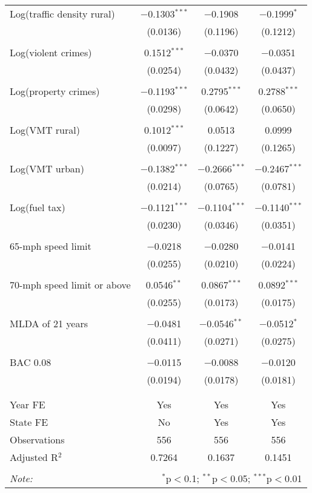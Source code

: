 \begin{table}[!htbp]
\begin{tabular}{@{\extracolsep{5pt}}lccc}
 Log(traffic density rural) & $-$0.1303$^{***}$ & $-$0.1908 & $-$0.1999$^{*}$ \\ 
  & (0.0136) & (0.1196) & (0.1212) \\ 
  & & & \\ 
 Log(violent crimes) & 0.1512$^{***}$ & $-$0.0370 & $-$0.0351 \\ 
  & (0.0254) & (0.0432) & (0.0437) \\ 
  & & & \\ 
 Log(property crimes) & $-$0.1193$^{***}$ & 0.2795$^{***}$ & 0.2788$^{***}$ \\ 
  & (0.0298) & (0.0642) & (0.0650) \\ 
  & & & \\ 
 Log(VMT rural) & 0.1012$^{***}$ & 0.0513 & 0.0999 \\ 
  & (0.0097) & (0.1227) & (0.1265) \\ 
  & & & \\ 
 Log(VMT urban) & $-$0.1382$^{***}$ & $-$0.2666$^{***}$ & $-$0.2467$^{***}$ \\ 
  & (0.0214) & (0.0765) & (0.0781) \\ 
  & & & \\ 
 Log(fuel tax) & $-$0.1121$^{***}$ & $-$0.1104$^{***}$ & $-$0.1140$^{***}$ \\ 
  & (0.0230) & (0.0346) & (0.0351) \\ 
  & & & \\ 
 65-mph speed limit & $-$0.0218 & $-$0.0280 & $-$0.0141 \\ 
  & (0.0255) & (0.0210) & (0.0224) \\ 
  & & & \\ 
 70-mph speed limit or above & 0.0546$^{**}$ & 0.0867$^{***}$ & 0.0892$^{***}$ \\ 
  & (0.0255) & (0.0173) & (0.0175) \\ 
  & & & \\ 
 MLDA of 21 years & $-$0.0481 & $-$0.0546$^{**}$ & $-$0.0512$^{*}$ \\ 
  & (0.0411) & (0.0271) & (0.0275) \\ 
  & & & \\ 
 BAC 0.08 & $-$0.0115 & $-$0.0088 & $-$0.0120 \\ 
  & (0.0194) & (0.0178) & (0.0181) \\ 
  & & & \\ 
\hline \\[-1.8ex] 
Year FE & Yes & Yes & Yes \\ 
State FE & No & Yes & Yes \\ 
Observations & 556 & 556 & 556 \\ 
Adjusted R$^{2}$ & 0.7264 & 0.1637 & 0.1451 \\ 
\hline 
\hline \\[-1.8ex] 
\textit{Note:}  & \multicolumn{3}{r}{$^{*}$p$<$0.1; $^{**}$p$<$0.05; $^{***}$p$<$0.01} \\ 
\end{tabular} 
\end{table} 
